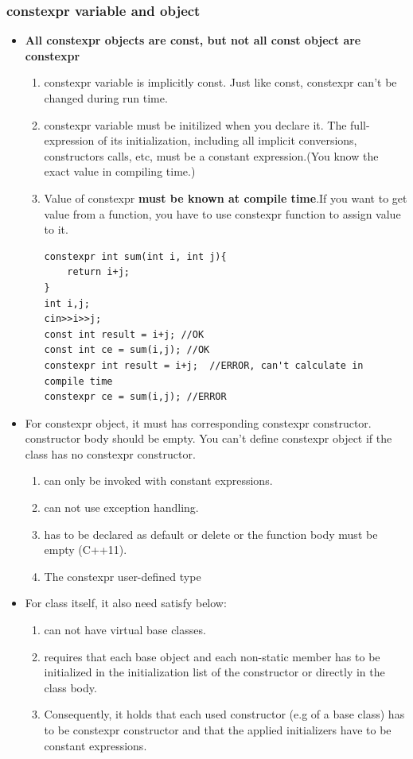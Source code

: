 \documentclass[a4paper,11pt,twoside]{book}
\begin{document}
\subsubsection{constexpr variable and object}
\begin{itemize}
	\item \textbf{All constexpr objects are const, but not all const object are constexpr}
	\begin{enumerate}
		\item constexpr variable is implicitly const. Just like const, constexpr can't be changed during run time.
		
		\item constexpr variable must be initilized when you declare it. The full-expression of its initialization, including all implicit conversions, constructors calls, etc, must be a constant expression.(You know the exact value in compiling time.)
		
		\item Value of constexpr \textbf{must be known at compile time}.If you want to get value from a function, you have to use constexpr function to assign value to it. 
		
\begin{lstlisting}
constexpr int sum(int i, int j){
	return i+j;
}
int i,j;
cin>>i>>j;
const int result = i+j; //OK
const int ce = sum(i,j); //OK
constexpr int result = i+j;  //ERROR, can't calculate in compile time
constexpr ce = sum(i,j); //ERROR
\end{lstlisting}		
	\end{enumerate}
	
	\item For constexpr object, it must has corresponding  constexpr constructor. constructor body should be empty. You can't define constexpr object if the class has no constexpr constructor.
	\begin{enumerate}
		\item can only be invoked with constant expressions.
		\item can not use exception handling.
		\item has to be declared as default or delete or the function body must be empty (C++11).
		\item The constexpr user-defined type
	\end{enumerate}
	
	\item For class itself, it also need satisfy below:
	\begin{enumerate}
		\item can not have virtual base classes.
		\item requires that each base object and each non-static member has to be initialized in the initialization list of the constructor or directly in the class body. 
		\item Consequently, it holds that each used constructor (e.g of a base class) has to be constexpr constructor and that the applied initializers have to be constant expressions.
	\end{enumerate}
	

\end{itemize}
\end{document}
